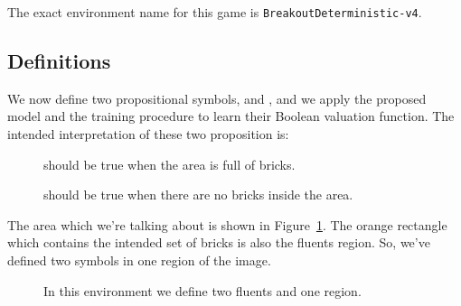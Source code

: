 The exact environment name for this game is \verb|BreakoutDeterministic-v4|.


\subsection{Definitions}

We now define two propositional symbols,  and , and
we apply the proposed model and the training procedure to learn their Boolean
valuation function. The intended interpretation of these two proposition is:
\begin{description}
	\item [] should be true when the area is full of bricks.
	\item [] should be true when there are no bricks inside the
		area.
\end{description}
The area which we're talking about is shown in
Figure~\ref{fig:breakout-fluents}. The orange rectangle which contains the
intended set of bricks is also the fluents region. So, we've defined two
symbols in one region of the image.
\begin{figure}
	\centering
	\caption{In this environment we define two fluents and one region.}
	\label{fig:breakout-fluents}
\end{figure}

